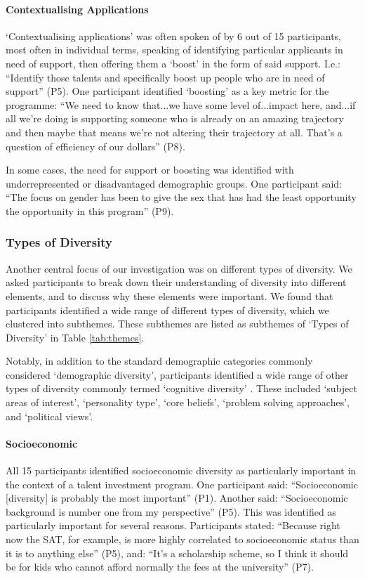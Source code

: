 \paragraph{Contextualising Applications}
`Contextualising applications' was often spoken of by 6 out of 15 participants, most often in individual terms, speaking of identifying particular applicants in need of support, then offering them a `boost' in the form of said support. I.e.: ``Identify those talents and specifically boost up people who are in need of support'' (P5). One participant identified `boosting' as a key metric for the programme: ``We need to know that...we have some level of...impact here, and...if all we're doing is supporting someone who is already on an amazing trajectory and then maybe that means we're not altering their trajectory at all. That's a question of efficiency of our dollars'' (P8).

In some cases, the need for support or boosting was identified with underrepresented or disadvantaged demographic groups. One participant said: ``The focus on gender has been to give the sex that has had the least opportunity the opportunity in this program'' (P9).

\subsubsection{Types of Diversity}
Another central focus of our investigation was on different types of diversity. We asked participants to break down their understanding of diversity into different elements, and to discuss why these elements were important. We found that participants identified a wide range of different types of diversity, which we clustered into subthemes. These subthemes are listed as subthemes of `Types of Diversity' in Table \ref{tab:themes}.

Notably, in addition to the standard demographic categories commonly considered `demographic diversity', participants identified a wide range of other types of diversity commonly termed `cognitive diversity' \cite{page2010diversity}. These included `subject areas of interest', `personality type', `core beliefs', `problem solving approaches', and `political views'.

\paragraph{Socioeconomic}
All 15 participants identified socioeconomic diversity as particularly important in the context of a talent investment program. One participant said: ``Socioeconomic [diversity] is probably the most important'' (P1). Another said: ``Socioeconomic background is number one from my perspective'' (P5). This was identified as particularly important for several reasons. Participants stated: ``Because right now the SAT, for example, is more highly correlated to socioeconomic status than it is to anything else'' (P5), and: ``It's a scholarship scheme, so I think it should be for kids who cannot afford normally the fees at the university'' (P7).

